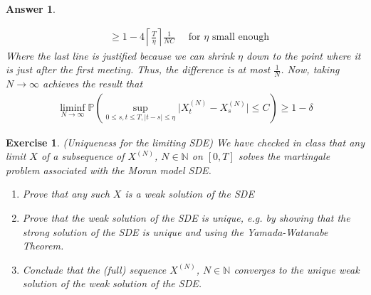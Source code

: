 \documentclass[12pt]{article}
\theoremstyle{colon}
\newtheorem{exercise}{Exercise}
\newtheorem*{answer}{Answer}
\begin{document}
\begin{answer}
\begin{enumerate}[label=\alph*)]
\begin{align*}
        &\geq 1 - 4 \left\lceil \frac{T}{\eta} \right\rceil \frac{1}{NC} \quad \text{ for $\eta$ small enough}
      \end{align*}
      Where the last line is justified because we can shrink $\eta$ down to the point where it is just after the first meeting. Thus, the difference is at most $\frac{1}{N}$. Now, taking $N \rightarrow \infty$ achieves the result that
      \begin{gather*}
        \liminf_{N \rightarrow \infty} \mathbb{P} \left( \sup_{0 \leq s, t \leq T, \lvert t - s \rvert \leq \eta} \lvert X_t^{(N)} - X_s^{(N)} \rvert \leq C \right) \geq 1 - \delta
      \end{gather*}
  \end{enumerate}
\end{answer}

\clearpage

\begin{exercise}
  (Uniqueness for the limiting SDE) We have checked in class that any limit $X$ of a subsequence of $X^{(N)}$, $N \in \mathbb{N}$ on $[0,T]$ solves the martingale problem associated with the Moran model SDE.
  \begin{enumerate}[label=\alph*)]
    \item Prove that any such $X$ is a weak solution of the SDE
    \item Prove that the weak solution of the SDE is unique, e.g. by showing that the strong solution of the SDE is unique and using the Yamada-Watanabe Theorem.
    \item Conclude that the (full) sequence $X^{(N)}$, $N \in \mathbb{N}$ converges to the unique weak solution of the weak solution of the SDE.
  \end{enumerate}
\end{exercise}
\end{document}
